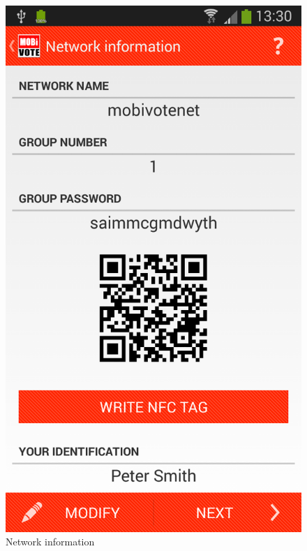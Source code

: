 \documentclass[numbers=noenddot, abstract=on, a4paper, headsepline,
footsepline, oneside, openright, draft=off, listof=leveldown]{scrreprt}
\begin{document}
\begin{figure}[!htb]
	\begin{minipage}{.5\textwidth}
  		\centering
		\includegraphics[height=.4\textheight]{img/screenshots/network_information}
		\caption{Network information}
		\label{fig:handbook_networkinformation}
		\end{minipage}
	\begin{minipage}{.5\textwidth}
  		\centering

\end{minipage}
\end{figure}
\end{document}
